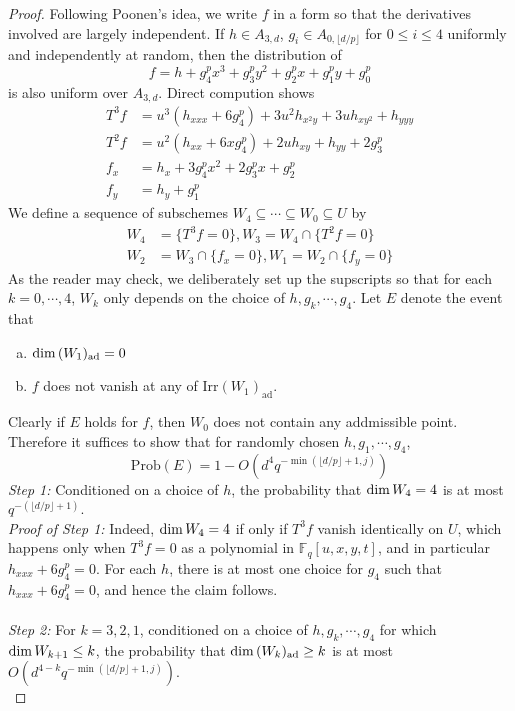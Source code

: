 \documentclass[12pt]{article}
\theoremstyle{plain}
\theoremstyle{definition}
\newcommand{\IF}{\mathbb{F}}
\renewcommand\dim{{\rm dim\,}}
\newcommand{\<}{\langle}
\renewcommand{\>}{\rangle}
\newcommand{\Prob}{\mathrm{Prob}}
\newcommand{\ad}{\mathrm{ad}}
\newcommand{\yk}{\lfloor d/p \rfloor}
\newcommand{\Irr}{\mathrm{Irr}}
\begin{document}
\begin{proof}
Following Poonen's idea, we write $f$ in a form so that the derivatives involved are largely independent. If $h \in A_{3, d}$, $g_i \in A_{0, \yk}$ for $0 \le i \le 4$ uniformly and independently at random, then the distribution of 
$$ f = h + g_4^p x^3  + g_3^p y^2 + g_2^p x + g_1^p y + g_0^p  $$ 
is also uniform over $A_{3, d}$. 
Direct compution shows 
\begin{align*}
T^3 f &= u^3(h_{xxx} + 6 g_4^p) + 3 u^2 h_{x^2 y} + 3 u h_{xy^2} + h_{yyy} \\
T^2 f &= u^2(h_{xx} + 6x g_4^p) + 2 u h_{xy} + h_{yy} + 2 g_3^p \\
f_x &= h_x + 3 g_4^p x^2 + 2 g_3^p x + g_2^p \\
f_y &= h_y + g_1^p
\end{align*}
We define a sequence of subschemes $W_4 \subseteq \cdots \subseteq W_0 \subseteq U$ by 
\begin{align*}
W_4 &= \{ T^3 f = 0 \}, W_3 = W_4 \cap \{ T^2 f = 0 \} \\
W_2 &= W_3 \cap \{ f_x = 0 \}, W_1 = W_2 \cap \{ f_y = 0 \}
\end{align*}
As the reader may check, we deliberately set up the supscripts so that for each $k = 0,\cdots, 4$, $W_k$ only depends on the choice of $h, g_{k}, \cdots, g_4$. Let $E$ denote the event that 
\begin{enumerate}[a.]
\item $\dim (W_1)_\ad = 0$
\item $f$ does not vanish at any of $\Irr (W_1)_\ad$. 
\end{enumerate} 
Clearly if $E$ holds for $f$, then $W_0$ does not contain any addmissible point. Therefore it suffices to show that for randomly chosen $h, g_1, \cdots, g_4$,
$$ \Prob(E) = 1 - O(d^4 q^{- \min(\yk + 1, j)})$$
\textit{Step 1:} Conditioned on a choice of $h$, the probability that $\dim W_4 = 4$ is at most $q^{-(\yk + 1)}$. \\
\textit{Proof of Step 1: }Indeed, $\dim W_4 = 4$ if only if $T^3 f$ vanish identically on $U$, which happens only when $T^3 f = 0$ as a polynomial in $\IF_q[u, x, y, t]$, and in particular $h_{xxx} + 6 g_4^p = 0$. For each $h$, there is at most one choice for $g_4$ such that $h_{xxx} + 6 g_4^p = 0$, and hence the claim follows. \\\\
\textit{Step 2:} For $k = 3, 2, 1$, conditioned on a choice of $h, g_k, \cdots, g_4$ for which $\dim W_{k + 1} \le k$, the probability that $\dim (W_k)_\ad \ge k$ is at most $O(d^{4 - k} q^{- \min(\yk + 1, j)})$.\\

\end{proof}
\end{document}
